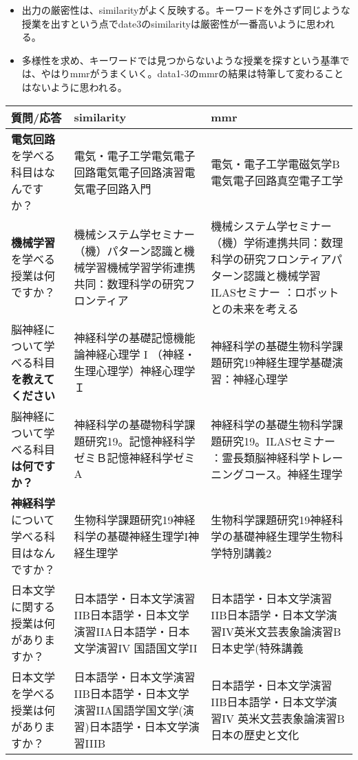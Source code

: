 \begin{itemize}
  \item 出力の厳密性は、similarityがよく反映する。キーワードを外さず同じような授業を出すという点でdate3のsimilarityは厳密性が一番高いように思われる。
  \item 多様性を求め、キーワードでは見つからないような授業を探すという基準では、やはりmmrがうまくいく。data1-3のmmrの結果は特筆して変わることはないように思われる。
\end{itemize}




\begin{table}[h!]
    \centering
    \begin{tabular}{|p{4cm}|p{6cm}|p{6cm}|}
        \hline
        質問/応答 & similarity & mmr \\ \hline
        \textbf{電気回路}を学べる科目はなんですか？ & 電気・電子工学電気電子回路電気電子回路演習電気電子回路入門 & 電気・電子工学電磁気学B電気電子回路真空電子工学 \\ \hline
        \textbf{機械学習}を学べる授業は何ですか？ & 機械システム学セミナー（機）パターン認識と機械学習機械学習学術連携共同：数理科学の研究フロンティア & 機械システム学セミナー（機）学術連携共同：数理科学の研究フロンティアパターン認識と機械学習 ILASセミナー ：ロボットとの未来を考える \\ \hline
        脳神経について学べる科目\textbf{を教えてください} & 神経科学の基礎記憶機能論神経心理学 I （神経・生理心理学）神経心理学Ｉ & 神経科学の基礎生物科学課題研究19神経生理学基礎演習：神経心理学 \\ \hline
        脳神経について学べる科目\textbf{は何ですか？} & 神経科学の基礎物科学課題研究19。記憶神経科学ゼミＢ記憶神経科学ゼミA & 神経科学の基礎生物科学課題研究19。ILASセミナー ：霊長類脳神経科学トレーニングコース。神経生理学 \\ \hline
        \textbf{神経科学}について学べる科目はなんですか？ & 生物科学課題研究19神経科学の基礎神経生理学I神経生理学 & 生物科学課題研究19神経科学の基礎神経生理学生物科学特別講義2 \\ \hline
        日本文学に関する授業は何がありますか？ & 日本語学・日本文学演習IIB日本語学・日本文学演習IIA日本語学・日本文学演習IV 国語国文学II & 日本語学・日本文学演習IIB日本語学・日本文学演習IV英米文芸表象論演習B日本史学(特殊講義 \\ \hline
        日本文学を学べる授業は何がありますか？ & 日本語学・日本文学演習IIB日本語学・日本文学演習IIA国語学国文学(演習)日本語学・日本文学演習IIIB & 日本語学・日本文学演習IIB日本語学・日本文学演習IV 英米文芸表象論演習B日本の歴史と文化 \\ \hline

\end{tabular}
\end{table}
